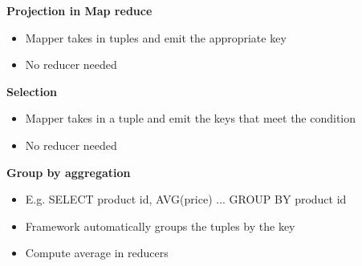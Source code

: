 \documentclass[10pt, landscape]{article}
\begin{document}
\begin{multicols}{4}
\textbf{Projection in Map reduce}
\begin{itemize}
  \item Mapper takes in tuples and emit the appropriate key 
  \item No reducer needed 
\end{itemize}

\textbf{Selection}
\begin{itemize}
  \item Mapper takes in a tuple and emit the keys that meet the condition 
  \item No reducer needed 
\end{itemize}


\textbf{Group by aggregation}
\begin{itemize}
  \item E.g. SELECT product id, AVG(price) ... GROUP BY product id 
  \item Framework automatically groups the tuples by the key
  \item Compute average in reducers 
\end{itemize}


\end{multicols}
\end{document}
